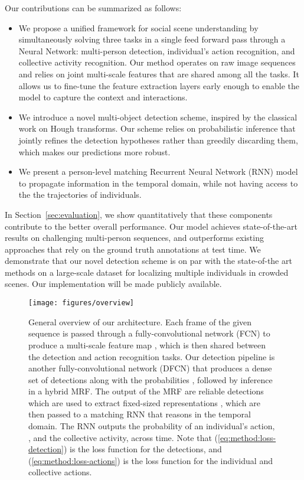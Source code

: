 \documentclass[10pt,twocolumn,letterpaper]{article}
\begin{document}
Our contributions can be summarized as follows:

\begin{itemize}
\setlength\itemsep{0cm}
\item We propose a unified framework for social scene understanding by simultaneously
solving three tasks in a single feed forward pass through a Neural Network: multi-person
detection, individual's action recognition, and collective activity recognition.  
Our method operates on raw image sequences and relies on joint multi-scale features 
that are shared among all the tasks. 
It allows us to fine-tune the feature extraction layers early enough to enable the model to capture the context and interactions.
\item We introduce a novel multi-object detection scheme, inspired by the classical
work on Hough transforms. Our scheme relies on probabilistic inference that jointly
refines the detection hypotheses rather than greedily discarding them, which makes
our predictions more robust.
\item We present a person-level matching Recurrent Neural Network (RNN) model to
propagate information in the temporal domain, while not having access to the the
trajectories of individuals.
\end{itemize}

In Section~\ref{sec:evaluation}, we show quantitatively that these
components contribute to the better overall performance. Our model achieves
state-of-the-art results on challenging multi-person sequences, and 
outperforms existing approaches that rely on the ground truth annotations at
test time. We demonstrate that our novel detection scheme is on par with the 
state-of-the art methods on a large-scale dataset for localizing multiple 
individuals in crowded scenes. Our implementation will be made publicly available.

\begin{figure*}[htp!]
\vspace{-0.25cm}
\begin{center}
\texttt{[image: figures/overview]}
\end{center}
\vspace{-0.5cm}
\caption{General overview of our architecture. Each frame of the given 
sequence is passed through a fully-convolutional network (FCN) to produce a 
multi-scale feature map , which is then shared between the detection and action 
recognition tasks. Our detection pipeline is another fully-convolutional network (DFCN) 
that produces a dense set of detections  along with the probabilities 
, followed by inference in a hybrid MRF. 
The output of the MRF are reliable detections  which are used to extract
fixed-sized representations , which are then passed to a matching RNN that reasons 
in the temporal domain. The RNN outputs the probability of an individual's action,
, and the collective activity,  across time. Note that  
(\ref{eq:method:loss-detection}) is the
loss function for the detections, and  (\ref{eq:method:loss-actions}) is the loss
function for the individual and collective actions.}
\label{fi:method:overview}
\vspace{-0.5cm}
\end{figure*} \vspace{-0.1cm}
\end{document}
